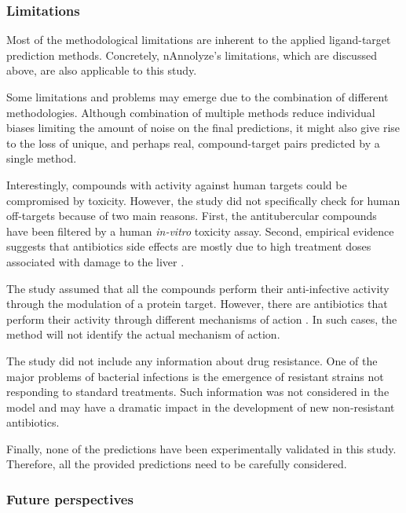 \documentclass[11pt, b5paper,twoside]{tesi_upf}
\begin{document}
 
\subsubsection{Limitations} 

\par Most of the methodological limitations are inherent to the applied ligand-target prediction methods. Concretely, nAnnolyze's limitations, which are discussed above, are also applicable to this study.  

\par Some limitations and problems may emerge due to the combination of different methodologies. Although combination of multiple methods reduce individual biases limiting the amount of noise on the final predictions, it might also give rise to the loss of unique, and perhaps real, compound-target pairs predicted by a single method.   

\par Interestingly, compounds with activity against human targets could be compromised by toxicity. However, the study did not specifically check for human off-targets because of two main reasons. First, the antitubercular compounds have been filtered by a human \textit{in-vitro} toxicity assay. Second, empirical evidence suggests that antibiotics side effects are mostly due to high treatment doses associated with damage to the liver \cite{Westphal1994}.

\par The study assumed that all the compounds perform their anti-infective activity through the modulation of a protein target. However, there are antibiotics that perform their activity through different mechanisms of action \cite{Ling2015a}. In such cases, the method will not identify the actual mechanism of action. 

\par The study did not include any information about drug resistance. One of the major problems of bacterial infections is the emergence of resistant strains not responding to standard treatments. Such information was not considered in the model and may have a dramatic impact in the development of new non-resistant antibiotics. 

\par Finally, none of the predictions have been experimentally validated in this study. Therefore, all the provided predictions need to be carefully considered. 
  


 \subsubsection{Future perspectives}
\end{document}
